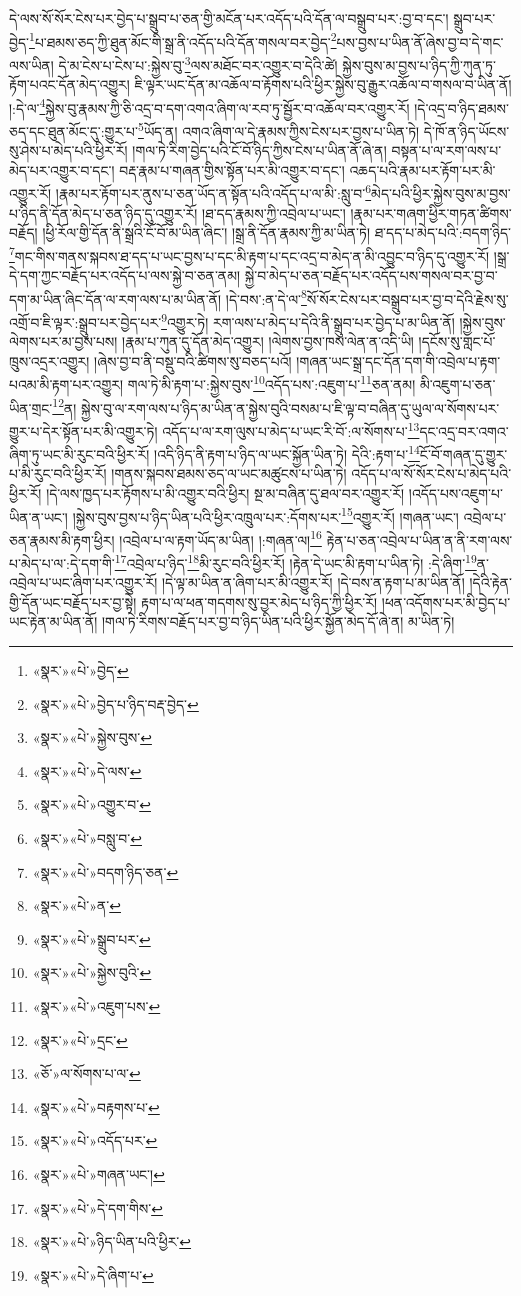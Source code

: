 དེ་ལས་སོ་སོར་ངེས་པར་བྱེད་པ་སྒྲུབ་པ་ཅན་གྱི་མངོན་པར་འདོད་པའི་དོན་ལ་བསྒྲུབ་པར་:བྱ་བ་དང་། སྒྲུབ་པར་བྱེད་\footnote{«སྣར་»«པེ་»བྱེད་}པ་ཐམས་ཅད་ཀྱི་ཐུན་མོང་གི་སྒྲ་ནི་འདོད་པའི་དོན་གསལ་བར་བྱེད་\footnote{«སྣར་»«པེ་»བྱེད་པ་ཉིད་བརྡ་བྱེད་}པས་བྱས་པ་ཡིན་ནོ་ཞེས་བྱ་བ་དེ་གང་ལས་ཡིན། དེ་མ་ངེས་པ་ངེས་པ་:སྐྱེས་བུ་\footnote{«སྣར་»«པེ་»སྐྱེས་བུས་}ལས་མཐོང་བར་འགྱུར་བ་དེའི་ཚེ། སྐྱེས་བུས་མ་བྱས་པ་ཉིད་ཀྱི་ཀུན་ཏུ་རྟོག་པའང་དོན་མེད་འགྱུར། ཇི་ལྟར་ཡང་དོན་མ་འཆོལ་བ་རྟོགས་པའི་ཕྱིར་སྐྱེས་བུ་རྒྱུར་འཆོལ་བ་གསལ་བ་ཡིན་ནོ། །:དེ་ལ་\footnote{«སྣར་»«པེ་»དེ་ལས་}སྐྱེས་བུ་རྣམས་ཀྱི་ཅི་འདྲ་བ་དག་འགའ་ཞིག་ལ་རབ་ཏུ་སྦྱོར་བ་འཆོལ་བར་འགྱུར་རོ། །དེ་འདྲ་བ་ཉིད་ཐམས་ཅད་དང་ཐུན་མོང་དུ་:གྱུར་པ་\footnote{«སྣར་»«པེ་»འགྱུར་བ་}ཡོད་ན། འགའ་ཞིག་ལ་དེ་རྣམས་ཀྱིས་ངེས་པར་བྱས་པ་ཡིན་ཏེ། དེ་ཁོ་ན་ཉིད་ཡོངས་སུ་ཤེས་པ་མེད་པའི་ཕྱིར་རོ། །གལ་ཏེ་རིག་བྱེད་པའི་ངོ་བོ་ཉིད་ཀྱིས་ངེས་པ་ཡིན་ནོ་ཞེ་ན། བསྟན་པ་ལ་རག་ལས་པ་མེད་པར་འགྱུར་བ་དང་། བརྡ་རྣམ་པ་གཞན་གྱིས་སྟོན་པར་མི་འགྱུར་བ་དང་། འཆད་པའི་རྣམ་པར་རྟོག་པར་མི་འགྱུར་རོ། །རྣམ་པར་རྟོག་པར་ནུས་པ་ཅན་ཡོད་ན་སྟོན་པའི་འདོད་པ་ལ་མི་:སླུ་བ་\footnote{«སྣར་»«པེ་»བསླུ་བ་}མེད་པའི་ཕྱིར་སྐྱེས་བུས་མ་བྱས་པ་ཉིད་ནི་དོན་མེད་པ་ཅན་ཉིད་དུ་འགྱུར་རོ། །ཐ་དད་རྣམས་ཀྱི་འབྲེལ་པ་ཡང་། །རྣམ་པར་གཞག་ཕྱིར་གཏན་ཚིགས་བརྗོད། །ཕྱི་རོལ་གྱི་དོན་ནི་སྒྲའི་ངོ་བོ་མ་ཡིན་ཞིང་། །སྒྲ་ནི་དོན་རྣམས་ཀྱི་མ་ཡིན་ཏེ། ཐ་དད་པ་མེད་པའི་:བདག་ཉིད་\footnote{«སྣར་»«པེ་»བདག་ཉིད་ཅན་}གང་གིས་གནས་སྐབས་ཐ་དད་པ་ཡང་བྱས་པ་དང་མི་རྟག་པ་དང་འདྲ་བ་མེད་ན་མི་འབྱུང་བ་ཉིད་དུ་འགྱུར་རོ། །སྒྲ་དེ་དག་ཀྱང་བརྗོད་པར་འདོད་པ་ལས་སྐྱེ་བ་ཅན་ནམ། སྐྱེ་བ་མེད་པ་ཅན་བརྗོད་པར་འདོད་པས་གསལ་བར་བྱ་བ་དག་མ་ཡིན་ཞིང་དོན་ལ་རག་ལས་པ་མ་ཡིན་ནོ། །དེ་བས་:ན་དེ་ལ་\footnote{«སྣར་»«པེ་»ན་}སོ་སོར་ངེས་པར་བསྒྲུབ་པར་བྱ་བ་དེའི་རྗེས་སུ་འགྲོ་བ་ཇི་ལྟར་:སྒྲུབ་པར་བྱེད་པར་\footnote{«སྣར་»«པེ་»སྒྲུབ་པར་}འགྱུར་ཏེ། རག་ལས་པ་མེད་པ་དེའི་ནི་སྒྲུབ་པར་བྱེད་པ་མ་ཡིན་ནོ། །སྐྱེས་བུས་ལེགས་པར་མ་བྱས་པས། །རྣམ་པ་ཀུན་དུ་དོན་མེད་འགྱུར། །ལེགས་བྱས་ཁས་ལེན་ན་འདི་ཡི། །དངོས་སུ་གླང་པོ་ཁྲུས་འདྲར་འགྱུར། །ཞེས་བྱ་བ་ནི་བསྡུ་བའི་ཚིགས་སུ་བཅད་པའོ། །གཞན་ཡང་སྒྲ་དང་དོན་དག་གི་འབྲེལ་པ་རྟག་པའམ་མི་རྟག་པར་འགྱུར། གལ་ཏེ་མི་རྟག་པ་:སྐྱེས་བུས་\footnote{«སྣར་»«པེ་»སྐྱེས་བུའི་}འདོད་པས་:འཇུག་པ་\footnote{«སྣར་»«པེ་»འཇུག་པས་}ཅན་ནམ། མི་འཇུག་པ་ཅན་ཡིན་གྲང་\footnote{«སྣར་»«པེ་»དྲང་}ན། སྐྱེས་བུ་ལ་རག་ལས་པ་ཉིད་མ་ཡིན་ན་སྐྱེས་བུའི་བསམ་པ་ཇི་ལྟ་བ་བཞིན་དུ་ཡུལ་ལ་སོགས་པར་གྱུར་པ་དེར་སྟོན་པར་མི་འགྱུར་ཏེ། འདོད་པ་ལ་རག་ལུས་པ་མེད་པ་ཡང་རི་བོ་:ལ་སོགས་པ་\footnote{«ཅོ་»ལ་སོགས་པ་ལ་}དང་འདྲ་བར་འགའ་ཞིག་ཏུ་ཡང་མི་རུང་བའི་ཕྱིར་རོ། །འདི་ཉིད་ནི་རྟག་པ་ཉིད་ལ་ཡང་སྐྱོན་ཡིན་ཏེ། དེའི་:རྟག་པ་\footnote{«སྣར་»«པེ་»བརྟགས་པ་}ངོ་བོ་གཞན་དུ་གྱུར་པ་མི་རུང་བའི་ཕྱིར་རོ། །གནས་སྐབས་ཐམས་ཅད་ལ་ཡང་མཚུངས་པ་ཡིན་ཏེ། འདོད་པ་ལ་སོ་སོར་ངེས་པ་མེད་པའི་ཕྱིར་རོ། །དེ་ལས་ཁྱད་པར་རྟོགས་པ་མི་འགྱུར་བའི་ཕྱིར། སྔ་མ་བཞིན་དུ་ཐལ་བར་འགྱུར་རོ། །འདོད་པས་འཇུག་པ་ཡིན་ན་ཡང་། །སྐྱེས་བུས་བྱས་པ་ཉིད་ཡིན་པའི་ཕྱིར་འཁྲུལ་པར་:དོགས་པར་\footnote{«སྣར་»«པེ་»འདོད་པར་}འགྱུར་རོ། །གཞན་ཡང་། འབྲེལ་པ་ཅན་རྣམས་མི་རྟག་ཕྱིར། །འབྲེལ་པ་ལ་རྟག་ཡོད་མ་ཡིན། །:གཞན་ལ།\footnote{«སྣར་»«པེ་»གཞན་ཡང་།} རྟེན་པ་ཅན་འབྲེལ་པ་ཡིན་ན་ནི་རག་ལས་པ་མེད་པ་ལ་:དེ་དག་གི་\footnote{«སྣར་»«པེ་»དེ་དག་གིས་}འབྲེལ་པ་ཉིད་\footnote{«སྣར་»«པེ་»ཉིད་ཡིན་པའི་ཕྱིར་}མི་རུང་བའི་ཕྱིར་རོ། །རྟེན་དེ་ཡང་མི་རྟག་པ་ཡིན་ཏེ། :དེ་ཞིག་\footnote{«སྣར་»«པེ་»དེ་ཞིག་པ་}ན་འབྲེལ་པ་ཡང་ཞིག་པར་འགྱུར་རོ། །དེ་ལྟ་མ་ཡིན་ན་ཞིག་པར་མི་འགྱུར་རོ། །དེ་བས་ན་རྟག་པ་མ་ཡིན་ནོ། །དེའི་རྟེན་གྱི་དོན་ཡང་བརྗོད་པར་བྱ་སྟེ། རྟག་པ་ལ་ཕན་གདགས་སུ་བྱར་མེད་པ་ཉིད་ཀྱི་ཕྱིར་རོ། །ཕན་འདོགས་པར་མི་བྱེད་པ་ཡང་རྟེན་མ་ཡིན་ནོ། །གལ་ཏེ་རིགས་བརྗོད་པར་བྱ་བ་ཉིད་ཡིན་པའི་ཕྱིར་སྐྱོན་མེད་དོ་ཞེ་ན། མ་ཡིན་ཏེ། 